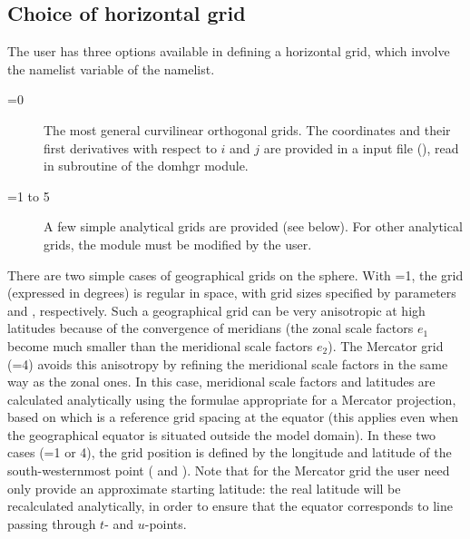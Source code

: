 \subsection{Choice of horizontal grid}
\label{DOM_hgr_msh_choice}

The user has three options available in defining a horizontal grid, which involve 
the namelist variable  of the  namelist. 
\begin{description}
\item[=0]  The most general curvilinear orthogonal grids.
The coordinates and their first derivatives with respect to $i$ and $j$ are provided
in a input file (), read in  subroutine of the domhgr module.
\item[=1 to 5] A few simple analytical grids are provided (see below). 
For other analytical grids, the  module must be modified by the user. 
\end{description}

There are two simple cases of geographical grids on the sphere. With 
=1, the grid (expressed in degrees) is regular in space, 
with grid sizes specified by parameters  and , 
respectively. Such a geographical grid can be very anisotropic at high latitudes 
because of the convergence of meridians (the zonal scale factors $e_1$ 
become much smaller than the meridional scale factors $e_2$). The Mercator 
grid (=4) avoids this anisotropy by refining the meridional scale 
factors in the same way as the zonal ones. In this case, meridional scale factors 
and latitudes are calculated analytically using the formulae appropriate for 
a Mercator projection, based on  which is a reference grid spacing 
at the equator (this applies even when the geographical equator is situated outside 
the model domain). 
In these two cases (=1 or 4), the grid position is defined by the 
longitude and latitude of the south-westernmost point ( 
and ). Note that for the Mercator grid the user need only provide 
an approximate starting latitude: the real latitude will be recalculated analytically, 
in order to ensure that the equator corresponds to line passing through $t$- 
and $u$-points.  

